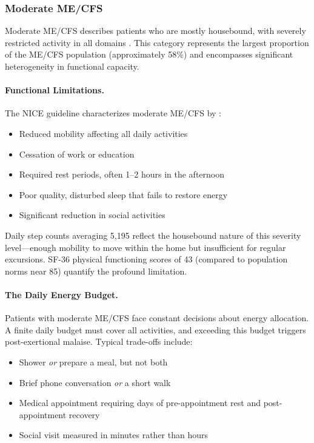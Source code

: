 \subsubsection{Moderate ME/CFS}

Moderate ME/CFS describes patients who are mostly housebound, with severely restricted activity in all domains \cite{Carruthers2011ICC, NICE2021mecfs}. This category represents the largest proportion of the ME/CFS population (approximately 58\%) and encompasses significant heterogeneity in functional capacity.

\paragraph{Functional Limitations.}
The NICE guideline characterizes moderate ME/CFS by \cite{NICE2021mecfs}:
\begin{itemize}
    \item Reduced mobility affecting all daily activities
    \item Cessation of work or education
    \item Required rest periods, often 1--2 hours in the afternoon
    \item Poor quality, disturbed sleep that fails to restore energy
    \item Significant reduction in social activities
\end{itemize}

Daily step counts averaging 5,195 reflect the housebound nature of this severity level---enough mobility to move within the home but insufficient for regular excursions. SF-36 physical functioning scores of 43 (compared to population norms near 85) quantify the profound limitation.

\paragraph{The Daily Energy Budget.}
Patients with moderate ME/CFS face constant decisions about energy allocation. A finite daily budget must cover all activities, and exceeding this budget triggers post-exertional malaise. Typical trade-offs include:
\begin{itemize}
    \item Shower \textit{or} prepare a meal, but not both
    \item Brief phone conversation \textit{or} a short walk
    \item Medical appointment requiring days of pre-appointment rest and post-appointment recovery
    \item Social visit measured in minutes rather than hours
\end{itemize}

